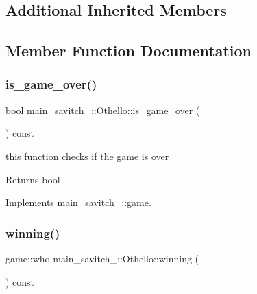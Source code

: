 \subsection*{Additional Inherited Members}


\subsection{Member Function Documentation}
\mbox{\label{classmain__savitch__14_1_1_othello_a540c8b0030e429e0ac30f07e9e8868ec}} 
\subsubsection{\texorpdfstring{is\+\_\+game\+\_\+over()}{is\_game\_over()}}
{\footnotesize\ttfamily bool main\+\_\+savitch\+\_\+::\+Othello\+::is\+\_\+game\+\_\+over (\begin{DoxyParamCaption}{ }\end{DoxyParamCaption}) const\hspace{0.3cm}{\ttfamily [virtual]}}



this function checks if the game is over 

\begin{DoxyReturn}{Returns}
bool 
\end{DoxyReturn}


Implements \hyperlink{classmain__savitch__14_1_1game}{main\+\_\+savitch\+\_\+::game}.

\mbox{\label{classmain__savitch__14_1_1_othello_a4ea78b18eea66c944c0a9356349e0fd4}} 
\subsubsection{\texorpdfstring{winning()}{winning()}}
{\footnotesize\ttfamily game\+::who main\+\_\+savitch\+\_\+::\+Othello\+::winning (\begin{DoxyParamCaption}{ }\end{DoxyParamCaption}) const\hspace{0.3cm}{\ttfamily [virtual]}}



